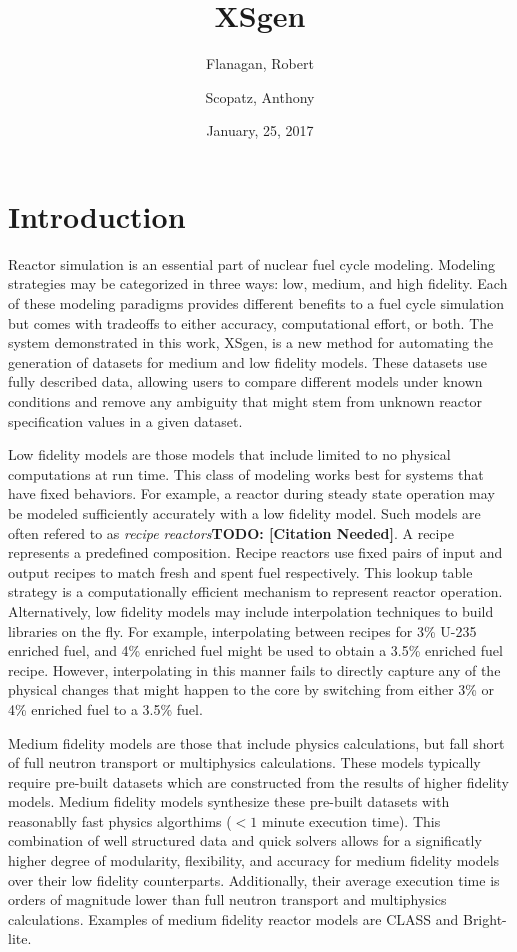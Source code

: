 \documentclass{article}
\newcommand{\TODO}[1] {{\color{red}\textbf{TODO: #1}}}
\newcommand{\citeme}{\TODO{[Citation Needed]}}
\begin{document}
\title{XSgen}
\date{January, 25, 2017}
\author{Flanagan, Robert \and Scopatz, Anthony}
\maketitle
\onehalfspacing

\section{Introduction}

Reactor simulation is an essential part of nuclear fuel cycle modeling. Modeling strategies
may be categorized in three ways: low, medium, and high fidelity. Each of these modeling
paradigms provides different benefits to a fuel cycle simulation but comes with tradeoffs to
either accuracy, computational effort, or both. The system demonstrated in this work, XSgen, 
is a new method for automating the generation of datasets for medium and low fidelity models. 
These datasets use fully described data, allowing users to compare different models under known
conditions and remove any ambiguity that might stem from unknown reactor specification values in a 
given dataset. 

Low fidelity models are those models that include limited to no physical computations at run time.
This class of modeling works best for systems that have fixed behaviors. For example, a reactor
during steady state operation may be modeled sufficiently accurately with a low fidelity model.
Such models are often refered to as \emph{recipe reactors}\citeme. A recipe represents a predefined
composition. Recipe reactors use fixed pairs of input and output recipes to
match fresh and spent
fuel respectively. This lookup table strategy is a computationally efficient mechanism to
represent reactor operation. Alternatively, low fidelity models may include interpolation
techniques to build libraries on the fly. For example, interpolating between recipes for
3\% U-235 enriched fuel, and 4\% enriched fuel might be used to obtain a 3.5\% enriched
fuel recipe.
However, interpolating in this manner fails to directly capture any of the physical changes
that might happen to the core by switching from either 3\% or 4\% enriched fuel to a 3.5\% fuel.

Medium fidelity models are those that include physics calculations, but fall short of
full neutron transport or multiphysics calculations. These models typically require
pre-built datasets which are constructed from the results of higher fidelity models.
Medium fidelity models synthesize these pre-built datasets with reasonablly fast physics
algorthims ($<1$ minute execution time). This combination of well structured data and
quick solvers allows for a significatly higher degree of modularity, flexibility, and accuracy
for medium fidelity models over their low fidelity counterparts. Additionally, their average
execution time is orders of magnitude lower than full neutron transport and multiphysics
calculations. Examples of medium fidelity reactor models are CLASS\cite{class}
and Bright-lite\cite{brightlite,flanagan}.
\end{document}
